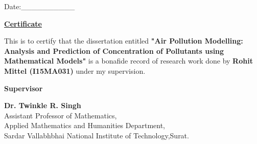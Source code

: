 \documentclass{report}
\begin{document}
\begin{flushright}
Date:\_\_\_\_\_\_\_\_\_\_
\end{flushright}
\begin{center}
\textbf{\underline{{\LARGE Certificate}}} \\
\end{center}

\vspace{0.5cm}

   {\large This is to certify that the dissertation entitled \textbf{"Air Pollution Modelling: Analysis and Prediction of Concentration of Pollutants using Mathematical Models"} is a bonafide record  of research work done by \textbf{Rohit Mittel (I15MA031)} under my supervision.} \\
   
   \vspace{5cm}

   \begin{center}
	   {\Large \textbf{Supervisor}} \\
   
   	\vspace{2cm}
   
   		\begin{Large}
   		 \textbf{Dr. Twinkle R. Singh} \\
   		Assistant Professor of Mathematics, \\
   		Applied Mathematics and Humanities Department, \\
   		Sardar Vallabhbhai National Institute of Technology,Surat.
   		 \end{Large} \\
   \end{center}
  
\end{document}
